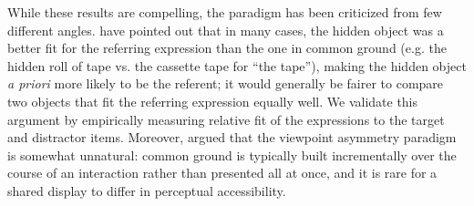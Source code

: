 \documentclass[manuscript]{stjour}
\begin{document}
While these results are compelling, the paradigm has been criticized from few different angles. 
\cite{HellerGrodnerTanenhaus08_Perspective} have pointed out that in many cases, the hidden object was a better fit for the referring expression than the one in common ground (e.g. the hidden roll of tape vs. the cassette tape for ``the tape''), making the hidden object \emph{a priori} more likely to be the referent; it would generally be fairer to compare two objects that fit the referring expression equally well. 
We validate this argument by empirically measuring relative fit of the expressions to the target and distractor items.
Moreover, \cite{HannaTanenhausTrueswell03_CommonGroundPerspective, HannaTanenhaus04_PragmaticEffects} argued that the viewpoint asymmetry paradigm is somewhat unnatural: common ground is typically built incrementally over the course of an interaction rather than presented all at once, and it is rare for a shared display to differ in perceptual accessibility. 
\end{document}
